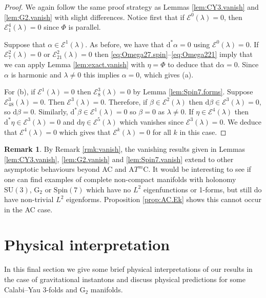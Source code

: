 \documentclass{article}
\theoremstyle{definition}
\newtheorem{rmk}[thm]{Remark}
\numberwithin{thm}{section}
\numberwithin{equation}{section}
\def\d{\mathrm{d}}
\begin{document}
\begin{proof}
We again follow the same proof strategy as Lemmas \ref{lem:CY3.vanish} and \ref{lem:G2.vanish} with slight differences.  Notice first that if $\mathcal{E}^0(\lambda)=0$, then $\mathcal{E}^4_1(\lambda)=0$ since $\Phi$ is parallel.

Suppose that $\alpha\in\mathcal{E}^1(\lambda)$.  As before, we have that $\d^*\alpha=0$ using $\mathcal{E}^0(\lambda)=0$.  If $\mathcal{E}^2_7(\lambda)=0$ or $\mathcal{E}^2_{21}(\lambda)=0$ then \eqref{eq:Omega27.spin}--\eqref{eq:Omega221} imply that we can apply Lemma \ref{lem:exact.vanish} with $\eta=\Phi$ to deduce that $\d\alpha=0$.  
Since $\alpha$ is harmonic and $\lambda\neq 0$ this implies $\alpha=0$, which gives (a).

For (b), if $\mathcal{E}^1(\lambda)=0$ then $\mathcal{E}^3_8(\lambda)=0$ by Lemma \ref{lem:Spin7.forms}.  Suppose $\mathcal{E}^3_{48}(\lambda)=0$.  Then $\mathcal{E}^3(\lambda)=0$.  Therefore, if $\beta\in\mathcal{E}^2(\lambda)$ then $\d\beta\in\mathcal{E}^3(\lambda)=0$, so $\d\beta=0$.  Similarly, $\d^*\beta\in\mathcal{E}^1(\lambda)=0$ so $\beta=0$ as $\lambda\neq 0$.  If $\eta\in\mathcal{E}^4(\lambda)$ then $\d^*\eta\in\mathcal{E}^3(\lambda)=0$ and $\d\eta\in\mathcal{E}^5(\lambda)$ which vanishes since $\mathcal{E}^3(\lambda)=0$.  We deduce that $\mathcal{E}^4(\lambda)=0$ which gives that $\mathcal{E}^k(\lambda)=0$ for all $k$ in this case.
\end{proof}

\begin{rmk}   By Remark \ref{rmk:vanish}, the vanishing results given in Lemmas \ref{lem:CY3.vanish}, \ref{lem:G2.vanish} and \ref{lem:Spin7.vanish}  extend to other asymptotic behaviours beyond AC and A$T^m$C.     
    It would be interesting to see if one can find examples of complete non-compact  manifolds with holonomy $\mathrm{SU}(3)$, $\mathrm{G}_2$ or $\mathrm{Spin}(7)$ which have no $L^2$ eigenfunctions or 1-forms, but still do have non-trivial $L^2$ eigenforms.  Proposition \ref{prop:AC.Ek} shows this cannot occur in the AC case.
\end{rmk}

\section{Physical interpretation}\label{sec:physics}

In this final section we give some brief physical interpretations of our results in the case of gravitational instantons and discuss physical predictions for some Calabi--Yau 3-folds and $\mathrm{G}_2$ manifolds. 
\end{document}
